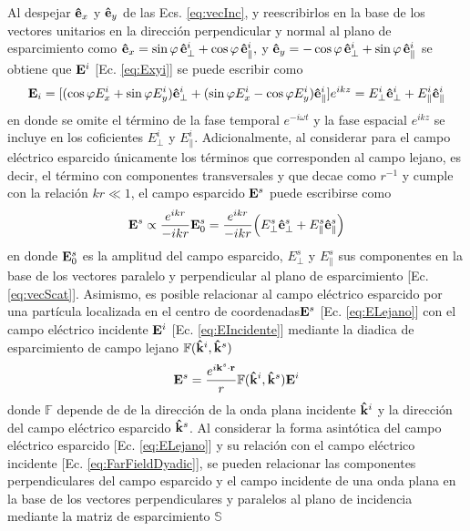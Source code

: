 Al despejar $\vu{e}_x$ y $\vu{e}_y$  de las Ecs. \eqref{eq:vecInc}, y reescribirlos en la base de los vectores unitarios en la dirección perpendicular y normal al plano de esparcimiento como $\vu{e}_x = \sin\varphi\,\vu{e}_{\perp}^i + \cos\varphi\,\vu{e}_{\parallel}^i, $ y $\vu{e}_y = - \cos\varphi \,\vu{e}_{\perp}^i + \sin\varphi\,\vu{e}_{\parallel}^i$ se obtiene que $\vb{E}^i$ [Ec. \eqref{eq:Exyi}] se puede escribir como
\begin{align}
\vb{E}_i = [(\cos\varphi E_{x}^i + \sin\varphi E_{y}^i)\vu{e}_{\perp}^i +
			 (\sin\varphi E_{x}^i - \cos\varphi E_{y}^i)\vu{e}_{\parallel}^i]
			 e^{ikz}
			 = E_{\perp}^i  \vu{e}_{\perp}^i + E_{\parallel}^i\vu{e}_{\parallel}^i
		\label{eq:EIncidente}
\end{align}
en donde se omite el término de la fase temporal $e^{-i\omega t}$ y la fase espacial $e^{ikz}$ se incluye en los coficientes $E_\perp^i$ y $E_\parallel^i$. Adicionalmente, al considerar para el campo eléctrico esparcido  únicamente los términos que corresponden al campo lejano, es decir, el término con componentes transversales y que decae como $r^{-1}$ y cumple con la relación $kr\ll 1$, el campo esparcido $\vb{E}^s$ puede escribirse como \cite{bohren1998absorption}
	\begin{align}
	\vb{E}^s \propto \frac{e^{ikr}}{-ikr}\vb{E}_0^s 
			=  \frac{e^{ikr}}{-ikr}
			\qty( E_{\perp}^s  \vu{e}_{\perp}^s + E_{\parallel}^s \vu{e}_{\parallel}^s) \label{eq:ELejano}
	\end{align}
en donde  $\vb{E}_0^s$ es la amplitud del campo esparcido,  $ E_{\perp}^s$ y  $ E_{\parallel}^s$ sus componentes en la base de los vectores paralelo y perpendicular al plano de esparcimiento [Ec. \eqref{eq:vecScat}]. Asimismo, es posible relacionar al campo eléctrico esparcido por una partícula localizada en el centro de coordenadas$\vb{E}^s$ [Ec. \eqref{eq:ELejano}] con el  campo eléctrico incidente $\vb{E}^i$ [Ec. \eqref{eq:EIncidente}]  mediante  la diadica de esparcimiento de campo lejano  $\mathbb{F}(\vu{k}^i,\vu{k}^s)$ \cite{tsang2000scattering}
	\begin{align}
	\vb{E}^s = \frac{e^{i\vb{k}^s\cdot\vb{r}}}{r}\mathbb{F}(\vu{k}^i,\vu{k}^s)\vb{E}^i
	\label{eq:FarFieldDyadic}
	\end{align}
donde $\mathbb{F}$ depende de de la dirección de la onda plana incidente $\vu{k}^i$ y la dirección del campo eléctrico esparcido $\vu{k}^s$. Al considerar la forma asintótica del campo eléctrico esparcido [Ec. \eqref{eq:ELejano}] y su relación con el campo eléctrico incidente [Ec. \eqref{eq:FarFieldDyadic}], se pueden relacionar las componentes perpendiculares del campo esparcido y el campo incidente de una onda plana en la base de los vectores perpendiculares y paralelos al plano de incidencia mediante la matriz de esparcimiento $\mathbb{S}$ \cite{bohren1998absorption}
